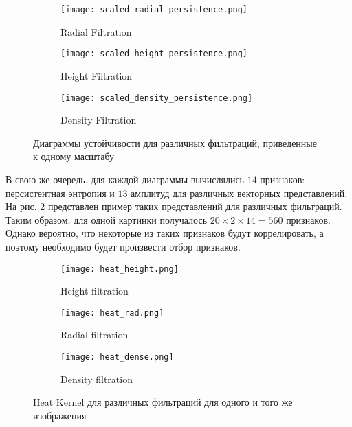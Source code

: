 \begin{figure}[!htbp]
	\begin{subfigure}{.33\textwidth}
		\centering
		\texttt{[image: scaled\_radial\_persistence.png]}\\
		\caption{Radial Filtration}
	\end{subfigure}%
	\begin{subfigure}{.33\textwidth}
		\centering
		\texttt{[image: scaled\_height\_persistence.png]}\\
		\caption{Height Filtration}
	\end{subfigure}%
	\begin{subfigure}{.33\textwidth}
		\centering
		\texttt{[image: scaled\_density\_persistence.png]}\\
		\caption{Density Filtration}
	\end{subfigure}%
	\caption{Диаграммы устойчивости для различных фильтраций, приведенные к одному масштабу}
	\label{scaled_persistences}
\end{figure}

В свою же очередь, для каждой диаграммы вычислялись $14$ признаков: персистентная энтропия и $13$ амплитуд для различных векторных представлений. На рис. \ref{representations} представлен пример таких представлений для различных фильтраций. Таким образом, для одной картинки получалось $20 \times 2 \times 14 = 560$ признаков. Однако вероятно, что некоторые из таких признаков будут коррелировать, а поэтому необходимо будет произвести отбор признаков.

\begin{figure}[!htbp]
	\begin{subfigure}{.33\textwidth}
		\centering
		\texttt{[image: heat\_height.png]}\\
		\caption{Height filtration}
	\end{subfigure}%
	\begin{subfigure}{.33\textwidth}
		\centering
		\texttt{[image: heat\_rad.png]}\\
		\caption{Radial filtration}
	\end{subfigure}%
	\begin{subfigure}{.33\textwidth}
		\centering
		\texttt{[image: heat\_dense.png]}\\
		\caption{Density filtration}
	\end{subfigure}%
	\caption{Heat Kernel для различных фильтраций для одного и того же изображения}
	\label{representations}
\end{figure}

